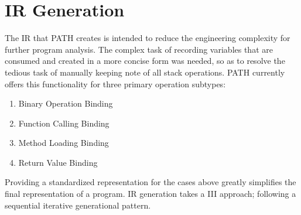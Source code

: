         \section{\acs{IR} Generation}
        \label{sec:irgen}
        \par The \acs{IR} that \acs{PATH} creates is intended to reduce the engineering complexity for further program analysis. The complex task of recording variables that are consumed and created in a more concise form
        was needed, so as to resolve the tedious task of manually keeping note of all stack operations. \acs{PATH} currently offers this functionality for three primary operation subtypes:
        \begin{enumerate}
            \item Binary Operation Binding
            \item Function Calling Binding
            \item Method Loading Binding
            \item Return Value Binding
        \end{enumerate}
        Providing a standardized representation for the cases above greatly simplifies the final representation of a program. \acs{IR} generation takes a \acs{III} approach; following a sequential iterative generational pattern.
